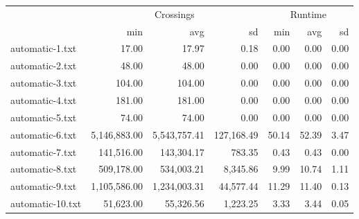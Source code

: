 \begin{tabular}{l|rrr|rrr|}
  \toprule   & \multicolumn{3}{c}{Crossings} & \multicolumn{3}{c}{Runtime} \\ & min & avg & sd & min & avg & sd \\ 
  \midrule automatic-1.txt & 17.00 & 17.97 & 0.18 & 0.00 & 0.00 & 0.00 \\ 
  automatic-2.txt & 48.00 & 48.00 & 0.00 & 0.00 & 0.00 & 0.00 \\ 
  automatic-3.txt & 104.00 & 104.00 & 0.00 & 0.00 & 0.00 & 0.00 \\ 
  automatic-4.txt & 181.00 & 181.00 & 0.00 & 0.00 & 0.00 & 0.00 \\ 
  automatic-5.txt & 74.00 & 74.00 & 0.00 & 0.00 & 0.00 & 0.00 \\ 
  automatic-6.txt & 5,146,883.00 & 5,543,757.41 & 127,168.49 & 50.14 & 52.39 & 3.47 \\ 
  automatic-7.txt & 141,516.00 & 143,304.17 & 783.35 & 0.43 & 0.43 & 0.00 \\ 
  automatic-8.txt & 509,178.00 & 534,003.21 & 8,345.86 & 9.99 & 10.74 & 1.11 \\ 
  automatic-9.txt & 1,105,586.00 & 1,234,003.31 & 44,577.44 & 11.29 & 11.40 & 0.13 \\ 
  automatic-10.txt & 51,623.00 & 55,326.56 & 1,223.25 & 3.33 & 3.44 & 0.05 \\ 
   \bottomrule \end{tabular}
